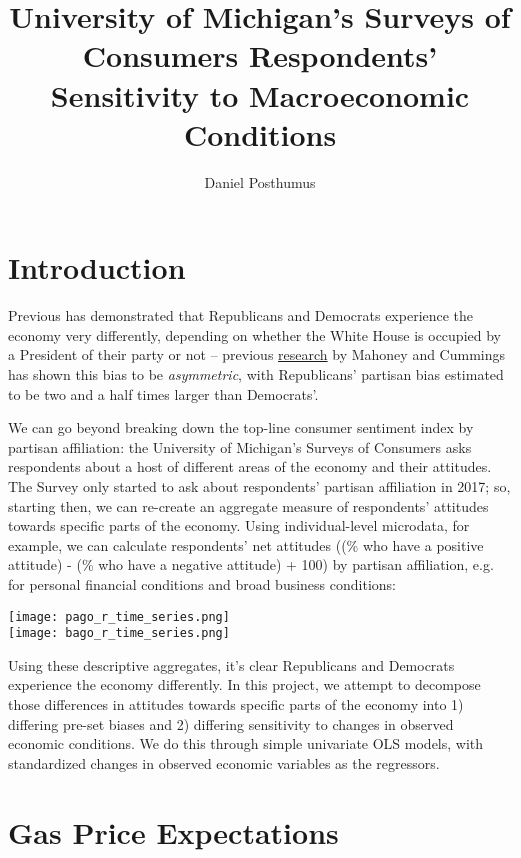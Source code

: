 \documentclass{article}
\title{University of Michigan's Surveys of Consumers Respondents' Sensitivity to Macroeconomic Conditions}
\author{Daniel Posthumus}
\begin{document}
\maketitle

\section{Introduction}

Previous has demonstrated that Republicans and Democrats experience the economy very differently, depending on whether the White House is occupied by a President of their party or not -- previous \href{https://www.briefingbook.info/p/asymmetric-amplification-and-the}{research} by Mahoney and Cummings has shown this bias to be \textit{asymmetric}, with Republicans' partisan bias estimated to be two and a half times larger than Democrats'.

We can go beyond breaking down the top-line consumer sentiment index by partisan affiliation: the University of Michigan's Surveys of Consumers asks respondents about a host of different areas of the economy and their attitudes. The Survey only started to ask about respondents' partisan affiliation in 2017; so, starting then, we can re-create an aggregate measure of respondents' attitudes towards specific parts of the economy. Using individual-level microdata, for example, we can calculate respondents' net attitudes ((\% who have a positive attitude) - (\% who have a negative attitude) + 100) by partisan affiliation, e.g. for personal financial conditions and broad business conditions:

\centering \texttt{[image: pago\_r\_time\_series.png]} \\
\texttt{[image: bago\_r\_time\_series.png]}

\raggedright Using these descriptive aggregates, it's clear Republicans and Democrats experience the economy differently. In this project, we attempt to decompose those differences in attitudes towards specific parts of the economy into 1) differing pre-set biases and 2) differing sensitivity to changes in observed economic conditions. We do this through simple univariate OLS models, with standardized changes in observed economic variables as the regressors. 

\section{Gas Price Expectations}
\end{document}
